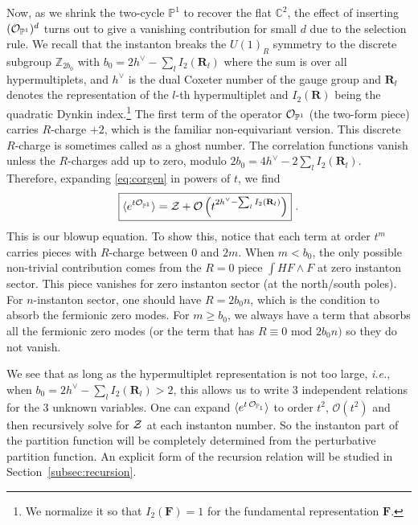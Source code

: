 \documentclass[letterpaper, 11pt]{article}
\def\IC{\mathbb{C}}
\def\IP{\mathbb{P}}
\def\IZ{\mathbb{Z}}
\def\CO{{\cal O}}
\def\CZ{{\cal Z}}
\begin{document}
Now, as we shrink the two-cycle $\IP^1$ to recover the flat $\IC^2$, the effect of inserting $({\CO}_{\IP^1})^d$ turns out to give a vanishing contribution for small $d$ due to the selection rule. We recall that the instanton breaks the $U(1)_R$ symmetry to the discrete subgroup $\IZ_{2b_0}$ with $b_0 = 2h^\vee - \sum_l I_2(\mathbf{R}_l)$ where the sum is over all hypermultiplets, and $h^\vee$ is the dual Coxeter number of the gauge group and $\mathbf{R}_l$ denotes the representation of the $l$-th hypermultiplet and $I_2(\mathbf{R})$ being the quadratic Dynkin index.\footnote{We normalize it so that $I_2(\mathbf{F})= 1$ for the fundamental representation $\mathbf{F}$.} The first term of the operator ${\CO}_{\IP^1}$ (the two-form piece) carries $R$-charge $+2$, which is the familiar non-equivariant version. This discrete $R$-charge is sometimes called as a ghost number. The correlation functions vanish unless the $R$-charges add up to zero, modulo $2b_0 = 4h^\vee - 2\sum_l I_2(\mathbf{R}_l)$. 
Therefore, expanding \eqref{eq:corgen} in powers of $t$, we find
\begin{align}
  \label{eq:donaldson-4d}
  \boxed{  \langle e^{t {\CO}_{\IP^1}}\rangle = \CZ + \CO \left(t^{2h^\vee -  \sum_l I_2(\mathbf{R}_l)}\right) } \ . 
\end{align}
This is our blowup equation. 
To show this, notice that each term at order $t^m$ carries pieces with $R$-charge between $0$ and $2m$. When $m < b_0$, the only possible non-trivial contribution comes from the $R=0$ piece $ \int H F\wedge F$ at zero instanton sector.  This piece vanishes for zero instanton sector (at the north/south poles). For $n$-instanton sector, one should have $R=2b_0 n$, which is the condition to absorb the fermionic zero modes. For $m \ge b_0$, we always have a term that absorbs all the fermionic zero modes (or the term that has $R \equiv 0 \textrm{ mod } 2b_0 n)$ so they do not vanish. 

We see that as long as the hypermultiplet representation is not too large, \emph{i.e.}, when $b_0 = 2h^\vee - \sum_l I_2(\mathbf{R}_l) > 2$, this allows us to write 3 independent relations for the 3 unknown variables. One can expand $\langle e^{t \, \CO_{\IP_1}}\rangle$ to order $t^2$, $\mathcal{O}(t^2)$ and then recursively solve for $\CZ$ at each instanton number. So the instanton part of the partition function will be completely determined from the perturbative partition function. An explicit form of the recursion relation will be studied in Section~\ref{subsec:recursion}.
\end{document}

